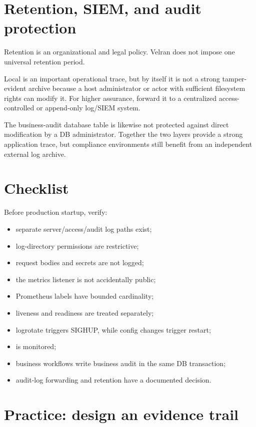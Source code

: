 \section{Retention, SIEM, and audit protection}

Retention is an organizational and legal policy. Velran does not impose one universal retention period.

Local  is an important operational trace, but by itself it is not a strong tamper-evident archive because a host administrator or actor with sufficient filesystem rights can modify it. For higher assurance, forward it to a centralized access-controlled or append-only log/SIEM system.

The business-audit database table is likewise not protected against direct modification by a DB administrator. Together the two layers provide a strong application trace, but compliance environments still benefit from an independent external log archive.

\section{Checklist}

Before production startup, verify:

\begin{itemize}
  \item separate server/access/audit log paths exist;
  \item log-directory permissions are restrictive;
  \item request bodies and secrets are not logged;
  \item the metrics listener is not accidentally public;
  \item Prometheus labels have bounded cardinality;
  \item liveness and readiness are treated separately;
  \item logrotate triggers SIGHUP, while config changes trigger restart;
  \item {} is monitored;
  \item business workflows write business audit in the same DB transaction;
  \item audit-log forwarding and retention have a documented decision.
\end{itemize}

\section{Practice: design an evidence trail}
